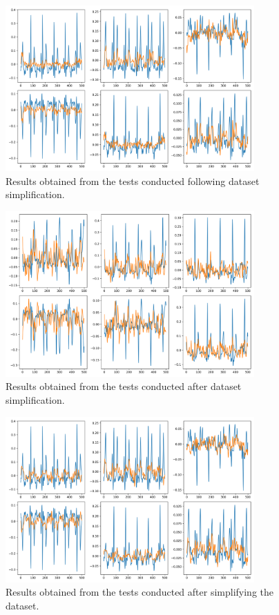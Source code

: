 \documentclass[12pt,italian]{report}
\begin{document}
\begin{figure}[H]
    \centering
    \includegraphics[width=0.85\textwidth]{images/first_cnn_result_second_plot_0.png}
    \captionsetup{justification=centering}
    \caption{Results obtained from the tests conducted following dataset simplification.}
    \label{fig:first_cnn_result_second_plot_0}
\end{figure}
\begin{figure}[H]
    \centering
    \includegraphics[width=0.85\textwidth]{images/first_cnn_result_second_plot_1.png}
    \captionsetup{justification=centering}
    \caption{Results obtained from the tests conducted after dataset simplification.}
    \label{fig:first_cnn_result_second_plot_1}
\end{figure}
\begin{figure}[H]
    \centering
    \includegraphics[width=0.85\textwidth]{images/second_cnn_result_second_plot_0.png}
    \captionsetup{justification=centering}
    \caption{Results obtained from the tests conducted after simplifying the dataset.}
    \label{fig:second_cnn_result_second_plot_0}
\end{figure}
\end{document}

